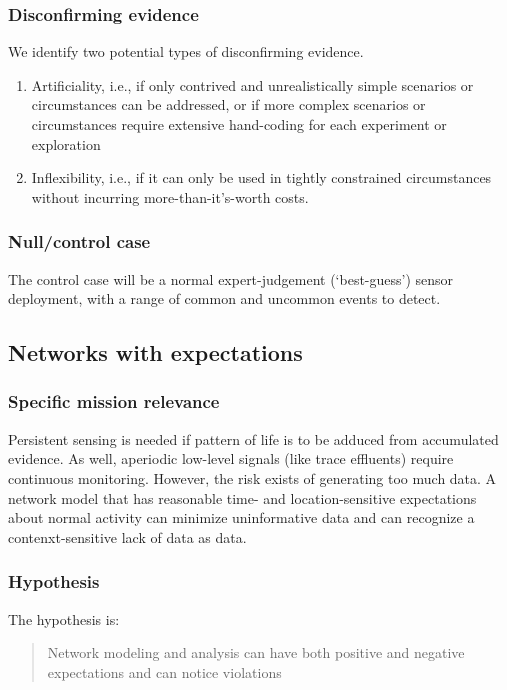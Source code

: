 \documentclass{article} %
\begin{document}
\subsubsection{Disconfirming evidence}
We identify two potential types of disconfirming evidence.
\begin{enumerate}
\item Artificiality, i.e., if only contrived and unrealistically simple scenarios or circumstances can be addressed, or if more complex scenarios or circumstances require extensive hand-coding for each experiment or exploration
\item Inflexibility, i.e., if it can only be used in tightly constrained circumstances without incurring more-than-it's-worth costs.
\end{enumerate}

\subsubsection{Null/control case}
The control case will be a normal expert-judgement (`best-guess') sensor deployment, with a range of common and uncommon events to detect.

\pagebreak
\subsection{Networks with expectations}
\subsubsection{Specific mission relevance}
Persistent sensing is needed if pattern of life is to be adduced from accumulated evidence. As well, aperiodic low-level signals (like trace effluents) require continuous monitoring. However, the risk exists of generating too much data. A network model that has reasonable time- and location-sensitive expectations about normal activity can minimize uninformative data and can recognize a contenxt-sensitive lack of data as data.

\subsubsection{Hypothesis}
The hypothesis is:
\begin{quote}
Network modeling and analysis can have both positive and negative expectations and can notice violations
\end{quote}
\end{document}
